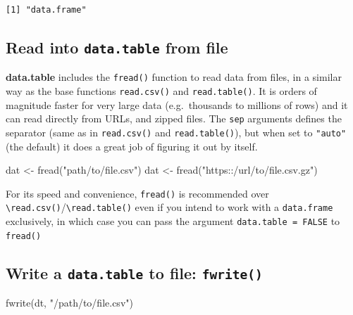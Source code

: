 \documentclass[
]{book}
\newenvironment{Shaded}{\begin{snugshade}}{\end{snugshade}}
\newcommand{\FunctionTok}[1]{\textcolor[rgb]{0.00,0.00,0.00}{#1}}
\newcommand{\NormalTok}[1]{#1}
\newcommand{\OtherTok}[1]{\textcolor[rgb]{0.56,0.35,0.01}{#1}}
\newcommand{\StringTok}[1]{\textcolor[rgb]{0.31,0.60,0.02}{#1}}
\begin{document}
\begin{verbatim}
[1] "data.frame"
\end{verbatim}

\hypertarget{read-into-data.table-from-file}{%
\subsection{\texorpdfstring{Read into \texttt{data.table} from file}{Read into data.table from file}}\label{read-into-data.table-from-file}}

\textbf{data.table} includes the \texttt{fread()} function to read data from files, in a similar way as the base functions \texttt{read.csv()} and \texttt{read.table()}. It is orders of magnitude faster for very large data (e.g.~thousands to millions of rows) and it can read directly from URLs, and zipped files. The \texttt{sep} arguments defines the separator (same as in \texttt{read.csv()} and \texttt{read.table()}), but when set to \texttt{"auto"} (the default) it does a great job of figuring it out by itself.

\begin{Shaded}
\begin{Highlighting}[]
\NormalTok{dat }\OtherTok{\textless{}{-}} \FunctionTok{fread}\NormalTok{(}\StringTok{"path/to/file.csv"}\NormalTok{)}
\NormalTok{dat }\OtherTok{\textless{}{-}} \FunctionTok{fread}\NormalTok{(}\StringTok{"https::/url/to/file.csv.gz"}\NormalTok{)}
\end{Highlighting}
\end{Shaded}

For its speed and convenience, \texttt{fread()} is recommended over \texttt{\textbackslash{}read.csv()}/\texttt{\textbackslash{}read.table()} even if you intend to work with a \texttt{data.frame} exclusively, in which case you can pass the argument \texttt{data.table\ =\ FALSE} to \texttt{fread()}

\hypertarget{write-a-data.table-to-file-fwrite}{%
\subsection{\texorpdfstring{Write a \texttt{data.table} to file: \texttt{fwrite()}}{Write a data.table to file: fwrite()}}\label{write-a-data.table-to-file-fwrite}}

\begin{Shaded}
\begin{Highlighting}[]
\FunctionTok{fwrite}\NormalTok{(dt, }\StringTok{"/path/to/file.csv"}\NormalTok{)}
\end{Highlighting}
\end{Shaded}
\end{document}
